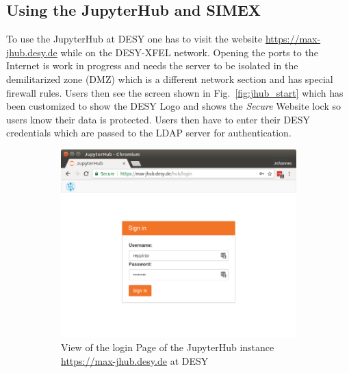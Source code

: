 \documentclass[10pt]{scrartcl}
\begin{document}
\subsection{Using the JupyterHub and SIMEX}
To use the JupyterHub at DESY one has to visit the website \url{https://max-jhub.desy.de} while on the DESY-XFEL network.
Opening the ports to the Internet is work in progress and needs the server to be isolated in the demilitarized zone (DMZ) which is a different network section and has special firewall rules.
Users then see the screen shown in Fig.~\ref{fig:jhub_start} which has been
customized to show the DESY Logo and shows the \textit{Secure} Website lock so
users know their data is protected.
Users then have to enter their DESY credentials which are passed to the LDAP
server for authentication.
%
\begin{figure}
  \centering
  \begin{subfigure}{0.45\textwidth} %
	  \includegraphics[width=\textwidth]{figures/jhub001.png}
	  \caption{View of the login Page of the JupyterHub instance \url{https://max-jhub.desy.de} at DESY} %
  \end{subfigure}
  \vspace{1em} %
  \begin{subfigure}{0.45\textwidth} %

\end{subfigure}
\end{figure}
\end{document}
